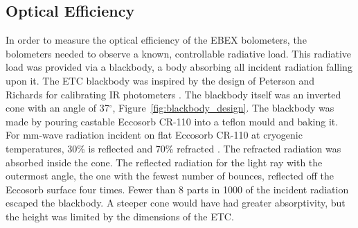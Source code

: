 \subsection{Optical Efficiency}
\label{sec:optical_efficiency}

%





In order to measure the optical efficiency of the \ac{EBEX} bolometers, the bolometers needed to observe a known, controllable radiative load.
This radiative load was provided via a blackbody, a body absorbing all incident radiation falling upon it. 
The \ac{ETC} blackbody was inspired by the design of Peterson and Richards for calibrating IR photometers \cite{Peterson1984a}. 
The blackbody itself was an inverted cone with an angle of 37$^{\circ}$, Figure~\ref{fig:blackbody_design}. 
The blackbody was made by pouring castable Eccosorb CR-110 into a teflon mould and baking it.
For mm-wave radiation incident on flat Eccosorb CR-110 at cryogenic temperatures, 30\% is reflected and 70\% refracted \cite{Peterson1984a}.
The refracted radiation was absorbed inside the cone. 
The reflected radiation for the light ray with the outermost angle, the one with the fewest number of bounces,  
reflected off the Eccosorb surface four times.
Fewer than 8 parts in 1000 of the incident radiation escaped the blackbody. 
A steeper cone would have had greater absorptivity, but the height was limited by the dimensions of the \ac{ETC}. 

